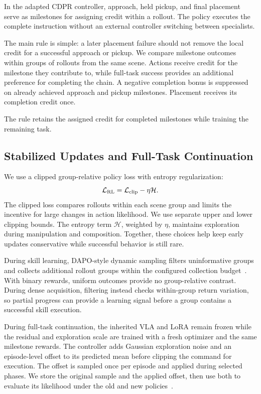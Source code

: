 


In the adapted CDPR controller, approach, held pickup, and final placement serve as milestones for assigning credit within a rollout. The policy executes the complete instruction without an external controller switching between specialists.

The main rule is simple: a later placement failure should not remove the local credit for a successful approach or pickup. We compare milestone outcomes within groups of rollouts from the same scene. Actions receive credit for the milestone they contribute to, while full-task success provides an additional preference for completing the chain. A negative completion bonus is suppressed on already achieved approach and pickup milestones. Placement receives its completion credit once.

The rule retains the assigned credit for completed milestones while training the remaining task.

\subsection{Stabilized Updates and Full-Task Continuation}\label{sec:rl_loss}
We use a clipped group-relative policy loss with entropy regularization:
\begin{equation}
\mathcal L_{\rm RL}=\mathcal L_{\rm clip}-\eta\mathcal H.
\label{eq:rl_loss}
\end{equation}
The clipped loss compares rollouts within each scene group and limits the incentive for large changes in action likelihood. We use separate upper and lower clipping bounds. The entropy term $\mathcal H$, weighted by $\eta$, maintains exploration during manipulation and composition. Together, these choices help keep early updates conservative while successful behavior is still rare.

During skill learning, DAPO-style dynamic sampling filters uninformative groups and collects additional rollout groups within the configured collection budget~\cite{dapo}. With binary rewards, uniform outcomes provide no group-relative contrast. During dense acquisition, filtering instead checks within-group return variation, so partial progress can provide a learning signal before a group contains a successful skill execution.

During full-task continuation, the inherited VLA and LoRA remain frozen while the residual and exploration scale are trained with a fresh optimizer and the same milestone rewards. The controller adds Gaussian exploration noise and an episode-level offset to its predicted mean before clipping the command for execution. The offset is sampled once per episode and applied during selected phases. We store the original sample and the applied offset, then use both to evaluate its likelihood under the old and new policies~\cite{capg}.

